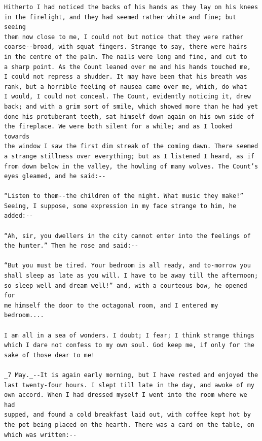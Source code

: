 \documentclass{article}
\begin{document}
\begin{verbatim}
Hitherto I had noticed the backs of his hands as they lay on his knees
in the firelight, and they had seemed rather white and fine; but seeing
them now close to me, I could not but notice that they were rather
coarse--broad, with squat fingers. Strange to say, there were hairs
in the centre of the palm. The nails were long and fine, and cut to
a sharp point. As the Count leaned over me and his hands touched me,
I could not repress a shudder. It may have been that his breath was
rank, but a horrible feeling of nausea came over me, which, do what
I would, I could not conceal. The Count, evidently noticing it, drew
back; and with a grim sort of smile, which showed more than he had yet
done his protuberant teeth, sat himself down again on his own side of
the fireplace. We were both silent for a while; and as I looked towards
the window I saw the first dim streak of the coming dawn. There seemed
a strange stillness over everything; but as I listened I heard, as if
from down below in the valley, the howling of many wolves. The Count’s
eyes gleamed, and he said:--

“Listen to them--the children of the night. What music they make!”
Seeing, I suppose, some expression in my face strange to him, he
added:--

“Ah, sir, you dwellers in the city cannot enter into the feelings of
the hunter.” Then he rose and said:--

“But you must be tired. Your bedroom is all ready, and to-morrow you
shall sleep as late as you will. I have to be away till the afternoon;
so sleep well and dream well!” and, with a courteous bow, he opened for
me himself the door to the octagonal room, and I entered my bedroom....

I am all in a sea of wonders. I doubt; I fear; I think strange things
which I dare not confess to my own soul. God keep me, if only for the
sake of those dear to me!

_7 May._--It is again early morning, but I have rested and enjoyed the
last twenty-four hours. I slept till late in the day, and awoke of my
own accord. When I had dressed myself I went into the room where we had
supped, and found a cold breakfast laid out, with coffee kept hot by
the pot being placed on the hearth. There was a card on the table, on
which was written:--


\end{verbatim}
\end{document}
